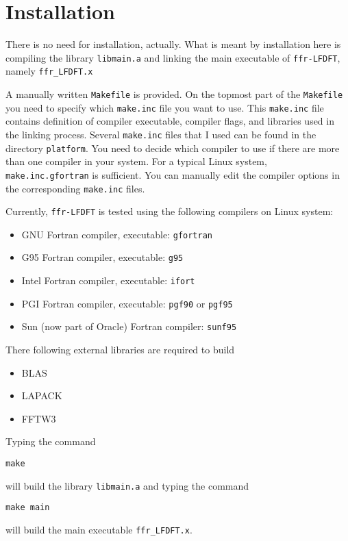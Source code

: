 \section{Installation}

There is no need for installation, actually.
What is meant by installation here is compiling the library
{\tt libmain.a} and
linking the main executable of {\tt ffr-LFDFT}, namely
{\tt ffr\_LFDFT.x}

A manually written {\tt Makefile} is provided. On the topmost part of the
{\tt Makefile} you need to specify which {\tt make.inc} file you
want to use.
This {\tt make.inc} file contains definition of compiler executable,
compiler flags, and libraries used in the linking process.
Several {\tt make.inc} files that I used can be found in
the directory {\tt platform}.
You need to decide which compiler to use if there
are more than one compiler in your system.
For a typical Linux system, {\tt make.inc.gfortran} is sufficient.
You can manually edit the compiler options in the corresponding {\tt make.inc}
files.

Currently, {\tt ffr-LFDFT} is tested using the following compilers
on Linux system:
\begin{itemize}
\item GNU Fortran compiler, executable: {\tt gfortran}
\item G95 Fortran compiler, executable: {\tt g95}
\item Intel Fortran compiler, executable: {\tt ifort}
\item PGI Fortran compiler, executable: {\tt pgf90} or {\tt pgf95}
\item Sun (now part of Oracle) Fortran compiler: {\tt sunf95}
\end{itemize}

There following external libraries are required to build \ffrLFDFT
\begin{itemize}
\item BLAS
\item LAPACK
\item FFTW3
\end{itemize}

Typing the command
\begin{verbatim}
make
\end{verbatim}
will build the library {\tt libmain.a} and typing
the command
\begin{verbatim}
make main
\end{verbatim}
will build the main executable {\tt ffr\_LFDFT.x}.


